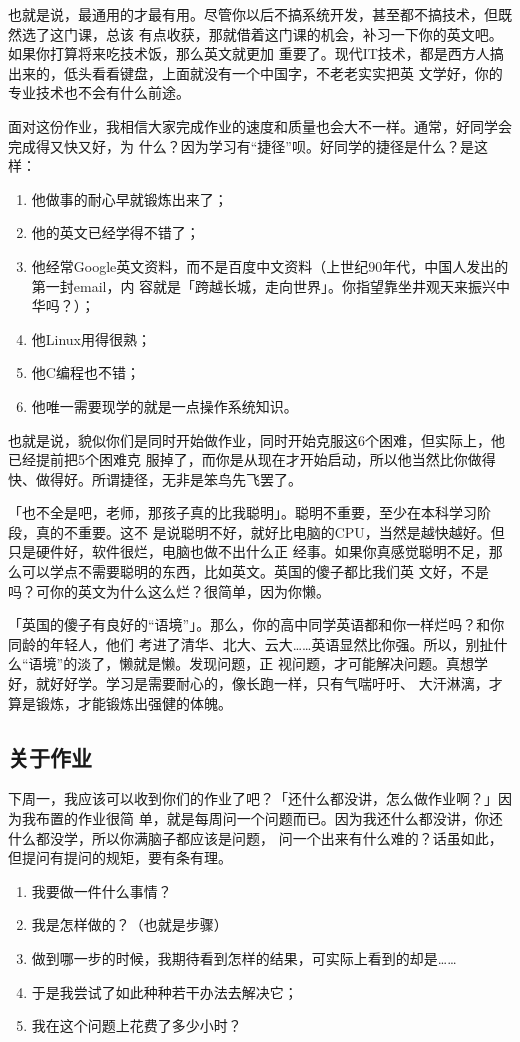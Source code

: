 \documentclass{wx672ctexart}
\begin{document}
也就是说，最通用的才最有用。尽管你以后不搞系统开发，甚至都不搞技术，但既然选了这门课，总该
有点收获，那就借着这门课的机会，补习一下你的英文吧。如果你打算将来吃技术饭，那么英文就更加
重要了。现代IT技术，都是西方人搞出来的，低头看看键盘，上面就没有一个中国字，不老老实实把英
文学好，你的专业技术也不会有什么前途。

面对这份作业，我相信大家完成作业的速度和质量也会大不一样。通常，好同学会完成得又快又好，为
什么？因为学习有“捷径”呗。好同学的捷径是什么？是这样：
\begin{enumerate}
\item 他做事的耐心早就锻炼出来了；
\item 他的英文已经学得不错了；
\item 他经常Google英文资料，而不是百度中文资料（上世纪90年代，中国人发出的第一封email，内
容就是「跨越长城，走向世界」。你指望靠坐井观天来振兴中华吗？）；
\item 他Linux用得很熟；
\item 他C编程也不错；
\item 他唯一需要现学的就是一点操作系统知识。
\end{enumerate}

也就是说，貌似你们是同时开始做作业，同时开始克服这6个困难，但实际上，他已经提前把5个困难克
服掉了，而你是从现在才开始启动，所以他当然比你做得快、做得好。所谓捷径，无非是笨鸟先飞罢了。

「也不全是吧，老师，那孩子真的比我聪明」。聪明不重要，至少在本科学习阶段，真的不重要。这不
是说聪明不好，就好比电脑的CPU，当然是越快越好。但只是硬件好，软件很烂，电脑也做不出什么正
经事。如果你真感觉聪明不足，那么可以学点不需要聪明的东西，比如英文。英国的傻子都比我们英
文好，不是吗？可你的英文为什么这么烂？很简单，因为你懒。

「英国的傻子有良好的“语境”」。那么，你的高中同学英语都和你一样烂吗？和你同龄的年轻人，他们
考进了清华、北大、云大……英语显然比你强。所以，别扯什么“语境”的淡了，懒就是懒。发现问题，正
视问题，才可能解决问题。真想学好，就好好学。学习是需要耐心的，像长跑一样，只有气喘吁吁、
大汗淋漓，才算是锻炼，才能锻炼出强健的体魄。

\subsection{关于作业}
\label{sec:orgd04aec4}

下周一，我应该可以收到你们的作业了吧？「还什么都没讲，怎么做作业啊？」因为我布置的作业很简
单，就是每周问一个问题而已。因为我还什么都没讲，你还什么都没学，所以你满脑子都应该是问题，
问一个出来有什么难的？话虽如此，但提问有提问的规矩，要有条有理。
\begin{enumerate}
\item 我要做一件什么事情？
\item 我是怎样做的？（也就是步骤）
\item 做到哪一步的时候，我期待看到怎样的结果，可实际上看到的却是……
\item 于是我尝试了如此种种若干办法去解决它；
\item 我在这个问题上花费了多少小时？
\end{enumerate}
\end{document}
